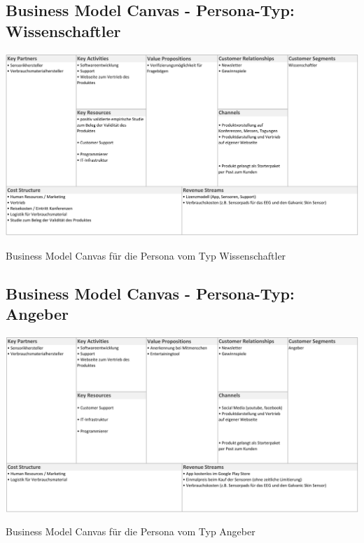 \documentclass[10pt, a4paper, oneside, titlepage]{scrartcl} %
\begin{document}
   	\begin{landscape}
	\newpage
	\subsection{Business Model Canvas - Persona-Typ: Wissenschaftler}
   	\begin{table}[h!]
		\begin{center}
			\includegraphics[width=1.3\textwidth]{business_canvas_1_wissenschftler.png}
		\end{center}
		\caption[Business Model Canvas - Persona-Typ: Wissenschaftler]{Business Model Canvas für die Persona vom Typ Wissenschaftler}
		\label{fig:business_model_1}
	\end{table}
	
	\newpage
   	\subsection{Business Model Canvas - Persona-Typ: Angeber}
   	\begin{table}[h!]
		\begin{center}
			\includegraphics[width=1.3\textwidth]{business_canvas_2_angeber.png}
		\end{center}
		\caption[Business Model Canvas - Persona-Typ: Angeber]{Business Model Canvas für die Persona vom Typ Angeber}
		\label{fig:business_model_2}
	\end{table}
	

\end{landscape}
\end{document}
